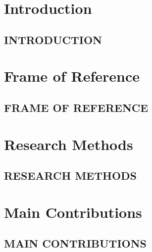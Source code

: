 \documentclass[english]{his-thesis}
\begin{document}


\part*{Introduction}
\label{part:introduction-method}

\mainmatter


\chapter{INTRODUCTION}
\label{ch:introduction}





\part*{Frame of Reference}
\label{part:frame-of-reference}

\chapter{FRAME OF REFERENCE}
\label{ch:baground}




\part*{Research Methods}
\label{part:method}


\chapter{RESEARCH METHODS}
\label{ch:method}





\part*{Main Contributions}
\label{part:contributions}


\chapter{MAIN CONTRIBUTIONS}
\label{ch:contributions}

\end{document}
